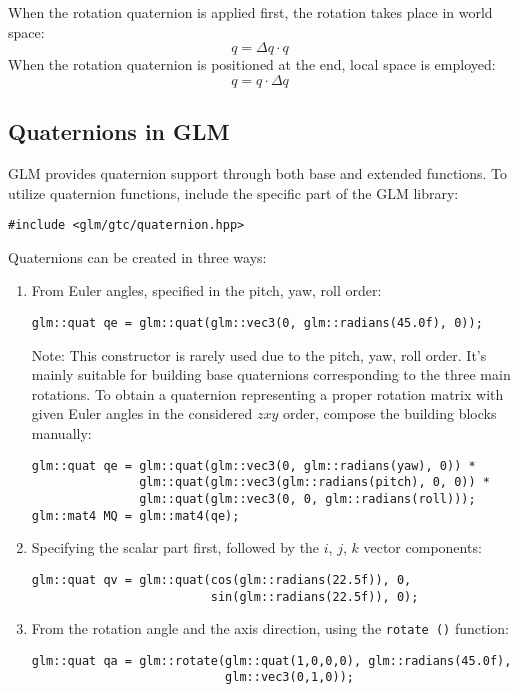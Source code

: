 When the rotation quaternion is applied first, the rotation takes place in world space:
\[q=\Delta q \cdot q\]
When the rotation quaternion is positioned at the end, local space is employed: 
\[q=q \cdot\Delta q\]

\subsection{Quaternions in GLM}
GLM provides quaternion support through both base and extended functions. 
To utilize quaternion functions, include the specific part of the GLM library:
\begin{verbatim}
#include <glm/gtc/quaternion.hpp>    
\end{verbatim}
Quaternions can be created in three ways:
\begin{enumerate}
    \item From Euler angles, specified in the pitch, yaw, roll order:
        \begin{verbatim}
glm::quat qe = glm::quat(glm::vec3(0, glm::radians(45.0f), 0));
        \end{verbatim}
        Note: This constructor is rarely used due to the pitch, yaw, roll order. 
        It's mainly suitable for building base quaternions corresponding to the three main rotations. 
        To obtain a quaternion representing a proper rotation matrix with given Euler angles in the considered $zxy$ order, compose the building blocks manually:
        \begin{verbatim}
glm::quat qe = glm::quat(glm::vec3(0, glm::radians(yaw), 0)) *
               glm::quat(glm::vec3(glm::radians(pitch), 0, 0)) *
               glm::quat(glm::vec3(0, 0, glm::radians(roll)));
glm::mat4 MQ = glm::mat4(qe);
        \end{verbatim}
    \item Specifying the scalar part first, followed by the $i$, $j$, $k$ vector components:
        \begin{verbatim}
glm::quat qv = glm::quat(cos(glm::radians(22.5f)), 0, 
                         sin(glm::radians(22.5f)), 0);
        \end{verbatim}
    \item From the rotation angle and the axis direction, using the \texttt{rotate ()} function: 
        \begin{verbatim}
glm::quat qa = glm::rotate(glm::quat(1,0,0,0), glm::radians(45.0f), 
                           glm::vec3(0,1,0));
        \end{verbatim}
\end{enumerate}
